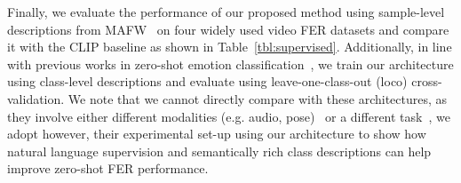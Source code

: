 \documentclass[10pt,twocolumn,letterpaper]{article}
\begin{document}
Finally, we evaluate the performance of our proposed method using sample-level descriptions from MAFW~\cite{liu_mafw_2022} on four widely used video FER datasets and compare it with the CLIP baseline as shown in Table~\ref{tbl:supervised}. Additionally, in line with previous works in zero-shot emotion classification~\cite{banerjee_learning_2022, xu_exploring_2022, zhan_zero-shot_2019, qi_zero-shot_2021}, we train our architecture using class-level descriptions and evaluate using leave-one-class-out (loco) cross-validation. We note that we cannot directly compare with these architectures, as they involve either different modalities (e.g. audio, pose)~\cite{banerjee_learning_2022, xu_exploring_2022, qi_zero-shot_2021, xu2023zero} or a different task~\cite{zhan_zero-shot_2019}, we adopt however, their experimental set-up using our architecture to show how natural language supervision and semantically rich class descriptions can help improve zero-shot FER performance. 
\end{document}
